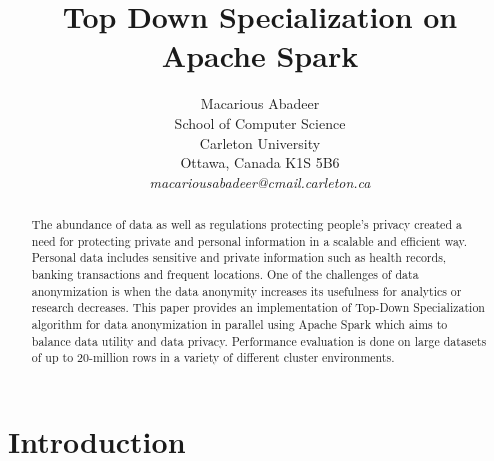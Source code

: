 \documentclass[11pt]{article}       %
\begin{document}


\title{Top Down Specialization on Apache Spark\texttrademark}


\author{
Macarious Abadeer\\
School of Computer Science\\
Carleton University\\
Ottawa, Canada K1S 5B6\\
{\em macariousabadeer@cmail.carleton.ca}
} %

\maketitle

\begin{abstract}
The abundance of data as well as regulations protecting people's privacy created a need for protecting private and personal information in a scalable and efficient way. Personal data includes sensitive and private information such as health records, banking transactions and frequent locations. One of the challenges of data anonymization is when the data anonymity increases its usefulness for analytics or research decreases. This paper provides an implementation of Top-Down Specialization algorithm for data anonymization in parallel using Apache Spark which aims to balance data utility and data privacy. Performance evaluation is done on large datasets of up to 20-million rows in a variety of different cluster environments.
\end{abstract}


\section{Introduction} \label{intro}
\end{document}
